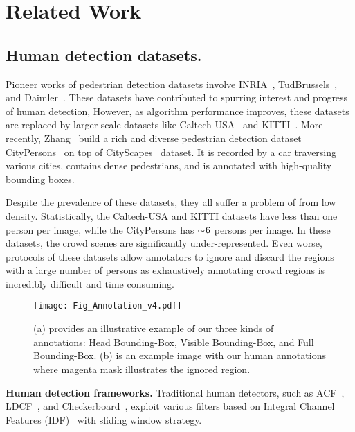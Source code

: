 \documentclass[10pt,twocolumn,letterpaper]{article}
\newcommand{\myparagraph}[1]{{\vspace{0.5em} \noindent \bf #1}}
\begin{document}
\section{Related Work}
\subsection{Human detection datasets.} 
Pioneer works of pedestrian detection datasets involve INRIA~\cite{dalal2005histograms}, TudBrussels~\cite{wojek2009multi}, and Daimler~\cite{enzweiler2009monocular}. These datasets have contributed to spurring interest and progress of human detection, However, as algorithm performance improves, these datasets are replaced by larger-scale datasets like Caltech-USA~\cite{dollar2009pedestrian} and KITTI~\cite{Geiger2012CVPR}. More recently, Zhang \etal~build a rich and diverse pedestrian detection dataset CityPersons~\cite{zhang2017citypersons} on top of CityScapes~\cite{cordts2016cityscapes} dataset. It is recorded by a car traversing various cities, contains dense pedestrians, and is annotated with high-quality bounding boxes. 

Despite the prevalence of these datasets, they all suffer a problem of from low density. Statistically, the Caltech-USA and KITTI datasets have less than one person per image, while the CityPersons has $\sim\negmedspace 6$ persons per image. In these datasets, the crowd scenes are significantly under-represented. Even worse, protocols of these datasets allow annotators to ignore and discard the regions with a large number of persons as exhaustively annotating crowd regions is incredibly difficult and time consuming. 




\begin{figure*}
\centering
\texttt{[image: Fig\_Annotation\_v4.pdf]}
\caption{(a) provides an illustrative example of our three kinds of annotations: Head Bounding-Box, Visible Bounding-Box, and Full Bounding-Box. (b) is an example image with our human annotations where magenta mask illustrates the ignored region.}
\label{fig:annotation_example}
\end{figure*}

\myparagraph{Human detection frameworks.} 
Traditional human detectors, such as ACF~\cite{dollar2014fast}, LDCF~\cite{nam2014local}, and Checkerboard~\cite{zhang2015filtered}, exploit various filters based on Integral Channel Features (IDF)~\cite{dollar2009integral} with sliding window strategy. 
\end{document}
